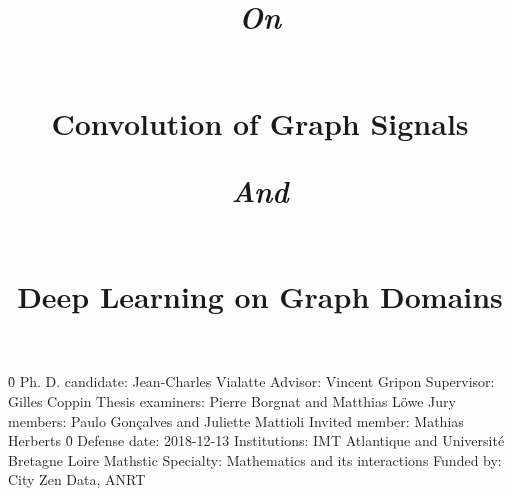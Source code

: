 \documentclass[12pt]{book}
\begin{document}

%
%

\pagestyle{empty}
\newline
\newline
\h{0}\newline
Ph. D. candidate: Jean-Charles Vialatte\newline
Advisor: Vincent Gripon\newline
Supervisor: Gilles Coppin\newline
Thesis examiners: Pierre Borgnat and Matthias Löwe\newline
Jury members: Paulo Gonçalves and Juliette Mattioli\newline
Invited member: Mathias Herberts\newline
\h{0}\newline
Defense date: 2018-12-13\newline
Institutions: IMT Atlantique and Université Bretagne Loire Mathstic\newline
Specialty: Mathematics and its interactions\newline
Funded by: City Zen Data, ANRT


%
%

\title{\begin{large}\emph{On}\end{large}\\Convolution of Graph Signals\\\begin{large}\emph{And}\end{large}\\Deep Learning on Graph Domains}
\date{}
\maketitle

%
%

\frontmatter
\pagestyle{plain}


%
%

 \dominitoc
 \tableofcontents
 \adjustmtc



\end{document}

